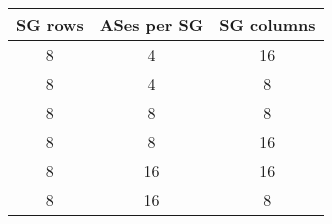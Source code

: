 \begin{tabular}{|c|c|c|}
\hline 
SG rows&
ASes per SG&
SG columns\\
\hline
\hline 
8&
4&
16\\
\hline 
8&
4&
8\\
\hline 
8&
8&
8\\
\hline 
8&
8&
16\\
\hline 
8&
16&
16\\
\hline 
8&
16&
8\\
\hline
\end{tabular}
